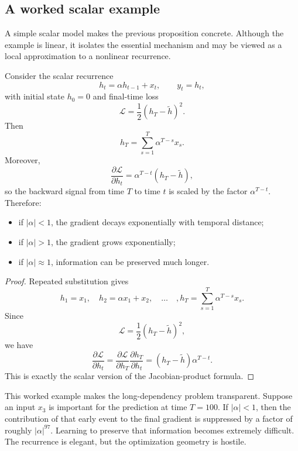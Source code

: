 \subsection*{A worked scalar example}

A simple scalar model makes the previous proposition concrete.
Although the example is linear, it isolates the essential mechanism and may be viewed as a local approximation to a nonlinear recurrence.

\begin{example}
Consider the scalar recurrence
\[
 h_t = \alpha h_{t-1} + x_t,
 \qquad y_t = h_t,
\]
with initial state $h_0=0$ and final-time loss
\[
\mathcal{L} = \frac{1}{2}(h_T-\widetilde{h})^2.
\]
Then
\[
 h_T = \sum_{s=1}^{T} \alpha^{T-s} x_s.
\]
Moreover,
\[
\frac{\partial \mathcal{L}}{\partial h_t} = \alpha^{T-t}(h_T-\widetilde{h}),
\]
so the backward signal from time $T$ to time $t$ is scaled by the factor $\alpha^{T-t}$.
Therefore:
\begin{itemize}
    \item if $|\alpha|<1$, the gradient decays exponentially with temporal distance;
    \item if $|\alpha|>1$, the gradient grows exponentially;
    \item if $|\alpha|\approx 1$, information can be preserved much longer.
\end{itemize}
\end{example}

\begin{proof}
Repeated substitution gives
\[
 h_1 = x_1,
 \quad
 h_2 = \alpha x_1 + x_2,
 \quad \dots \quad,
 h_T = \sum_{s=1}^{T} \alpha^{T-s}x_s.
\]
Since
\[
\mathcal{L} = \frac12 (h_T-\widetilde{h})^2,
\]
we have
\[
\frac{\partial \mathcal{L}}{\partial h_t}
=
\frac{\partial \mathcal{L}}{\partial h_T}
\frac{\partial h_T}{\partial h_t}
=
(h_T-\widetilde{h})\alpha^{T-t}.
\]
This is exactly the scalar version of the Jacobian-product formula.
\end{proof}

\medskip

This worked example makes the long-dependency problem transparent.
Suppose an input $x_3$ is important for the prediction at time $T=100$.
If $|\alpha|<1$, then the contribution of that early event to the final gradient is suppressed by a factor of roughly $|\alpha|^{97}$.
Learning to preserve that information becomes extremely difficult.
The recurrence is elegant, but the optimization geometry is hostile.

